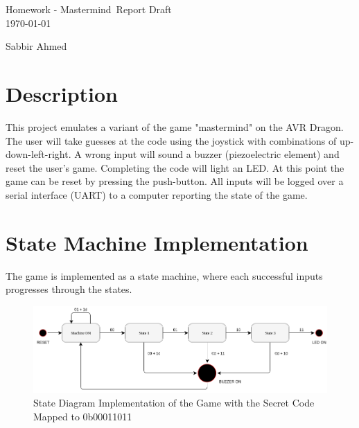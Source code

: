 \documentclass[usletter, 12pt]{article}
\newcommand{\project}{Homework - Mastermind}
\newcommand{\Sabbir}{Sabbir Ahmed}
\begin{document}

    \begin{titlepage}

        \vspace*{\fill} %
        \begin{center}

            {\LARGE \project~Report Draft}\\ [1.5cm]

            \today
            
            \vspace*{\fill}

            \Sabbir

        \end{center}
        \vspace*{\fill} %

    \end{titlepage}

    \section{Description}

        This project emulates a variant of the game "mastermind" on the AVR Dragon. The user will take guesses at the code using the joystick with combinations of up-down-left-right. A wrong input will sound a buzzer (piezoelectric element) and reset the user’s game. Completing the code will light an LED. At this point the game can be reset by pressing the push-button. All inputs will be logged over a serial interface (UART) to a computer reporting the state of the game.

    \section{State Machine Implementation}

        The game is implemented as a state machine, where each successful inputs progresses through the states.

        \begin{figure}[ht]
            \begin{center}
                \includegraphics[width=1\textwidth]{figures/state_diagram.png}
                \caption{State Diagram Implementation of the Game with the Secret Code Mapped to 0b00011011} \label{fig:state_diagram}
            \end{center}
        \end{figure}
\end{document}
